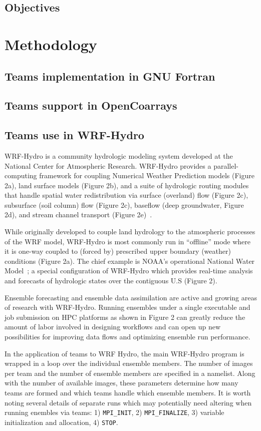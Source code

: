 \subsection{Objectives}

\section{Methodology}
\subsection{Teams implementation in GNU Fortran}
\subsection{Teams support in OpenCoarrays}
\subsection{Teams use in WRF-Hydro}

WRF-Hydro is a community hydrologic modeling system developed at the
National Center for Atmospheric Research.  WRF-Hydro provides a
parallel-computing framework for coupling Numerical Weather Prediction
models (Figure 2a), land surface models (Figure 2b), and a suite of hydrologic routing modules that handle
spatial water redistribution via surface (overland) flow (Figure 2c),
subsurface (soil column) flow (Figure 2c), baseflow (deep groundwater,
Figure 2d), and stream
channel transport (Figure 2e)~\cite{gochisEtal}. 

While originally developed to couple land hydrology to the atmospheric processes of
the WRF model, WRF-Hydro is most commonly run in ``offline'' mode where it is one-way
coupled to (forced by) prescribed upper boundary (weather)
conditions (Figure 2a). The chief example is NOAA's operational
National Water Model~\cite{noaa2016}; a special configuration of
WRF-Hydro which provides real-time analysis and forecasts of
hydrologic states over the contiguous U.S (Figure 2). 

Ensemble forecasting and ensemble data assimilation are active and
growing areas of research with WRF-Hydro. Running ensembles under a
single executable and job submission on HPC platforms as shown in
Figure 2 can greatly reduce the amount
of labor involved in designing workflows and can open up new
possibilities for improving data flows and optimizing ensemble run
performance.

In the application of teams to WRF Hydro, the main WRF-Hydro program is wrapped in a loop
over the individual ensemble members. The number of images per team and the
 number of ensemble members are specified in a namelist. Along with
 the number of available images, these parameters determine how many
 teams are formed and which teams handle which ensemble members. It is
 worth noting several details of separate runs which may potentially need altering
 when running enembles via teams: 1) \texttt{MPI\_INIT}, 2) \texttt{MPI\_FINALIZE}, 3)
 variable initialization and allocation, 4) \texttt{STOP}.   
 
